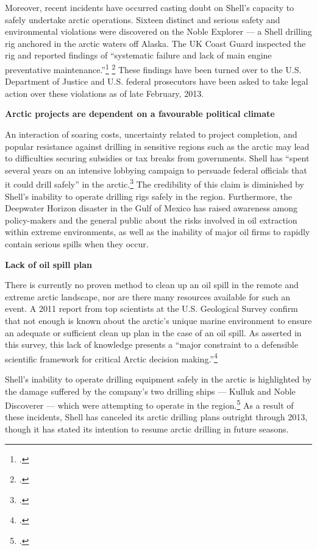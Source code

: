 Moreover, recent incidents have occurred casting doubt on Shell's capacity to safely undertake arctic operations. 
Sixteen distinct and serious safety and environmental violations were discovered on the Noble Explorer --- a Shell drilling rig anchored in the arctic waters off Alaska. 
The UK Coast Guard inspected the rig and reported findings of ``systematic failure and lack of main engine preventative maintenance.''\footcite{RigFindings} \footcite[See also: ][]{ArcticUnsafe}
These findings have been turned over to the U.S. Department of Justice and U.S. federal prosecutors have been asked to take legal action over these violations as of late February, 2013. 



\textbf{Arctic projects are dependent on a favourable political climate}



An interaction of soaring costs, uncertainty related to project completion, and popular resistance against drilling in sensitive regions such as the arctic may lead to difficulties securing subsidies or tax breaks from governments.
Shell has ``spent several years on an intensive lobbying campaign to persuade federal officials that it could drill safely'' in the arctic.\footcite{ShellSuspends}
The credibility of this claim is diminished by Shell's inability to operate drilling rigs safely in the region.
Furthermore, the Deepwater Horizon disaster in the Gulf of Mexico has raised awareness among policy-makers and the general public about the risks involved in oil extraction within extreme environments, as well as the inability of major oil firms to rapidly contain serious spills when they occur.



\textbf{Lack of oil spill plan}



There is currently no proven method to clean up an oil spill in the remote and extreme arctic landscape, nor are there many resources available for such an event. 
A 2011 report from top scientists at the U.S. Geological Survey confirm that not enough is known about the arctic's unique marine environment to ensure an adequate or sufficient clean up plan in the case of an oil spill. 
As asserted in this survey, this lack of knowledge presents a ``major constraint to a defensible scientific framework for critical Arctic decision making.''\footcite[][]{Holland-BartelsPierce_2011}



Shell's inability to operate drilling equipment safely in the arctic is highlighted by the damage suffered by the company's two drilling ships --- Kulluk and Noble Discoverer --- which were attempting to operate in the region.\footcite{ShellSuspends}
As a result of these incidents, Shell has canceled its arctic drilling plans outright through 2013, though it has stated its intention to resume arctic drilling in future seasons.



